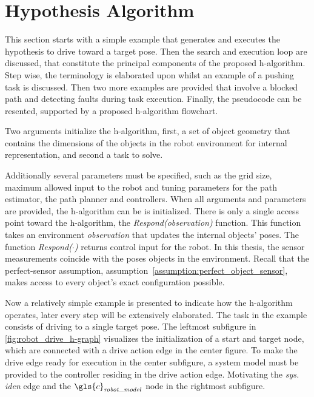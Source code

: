 \section{Hypothesis Algorithm}%
\label{sec:h-algorithm}
This section starts with a simple example that generates and executes the hypothesis to drive toward a target pose. Then the search and execution loop are discussed, that constitute the principal components of the proposed \ac{h-algorithm}. Step wise, the terminology is elaborated upon whilst an example of a pushing task is discussed. Then two more examples are provided that involve a blocked path and detecting faults during task execution. Finally, the pseudocode can be resented, supported by a proposed \ac{h-algorithm} flowchart.\bs

Two arguments initialize the \ac{h-algorithm}, first, a set of object geometry that contains the dimensions of the objects in the robot environment for internal representation, and second a task to solve.\bs

Additionally several parameters must be specified, such as the grid size, maximum allowed input to the robot and tuning parameters for the path estimator, the path planner and controllers. When all arguments and parameters are provided, the \ac{h-algorithm} can be is initialized. There is only a single access point toward the \ac{h-algorithm}, the \textit{Respond(observation)} function. This function takes an environment \textit{observation} that updates the internal objects' poses. The function \textit{Respond($\cdot$)} returns control input for the robot. In this thesis, the sensor measurements coincide with the poses objects in the environment. Recall that the perfect-sensor assumption, assumption~\ref{assumption:perfect_object_sensor}, makes access to every object's exact configuration possible.\bs

Now a relatively simple example is presented to indicate how the \ac{h-algorithm} operates, later every step will be extensively elaborated. The task in the example consists of driving to a single target pose. The leftmost subfigure in \cref{fig:robot_drive_h-graph} visualizes the initialization of a start and target node, which are connected with a drive action edge in the center figure. To make the drive edge ready for execution in the center subfigure, a system model must be provided to the controller residing in the drive action edge. Motivating the \textit{sys. iden} edge and the $\gls{c}_\textit{robot\_model}$ node in the rightmost subfigure.\bs

